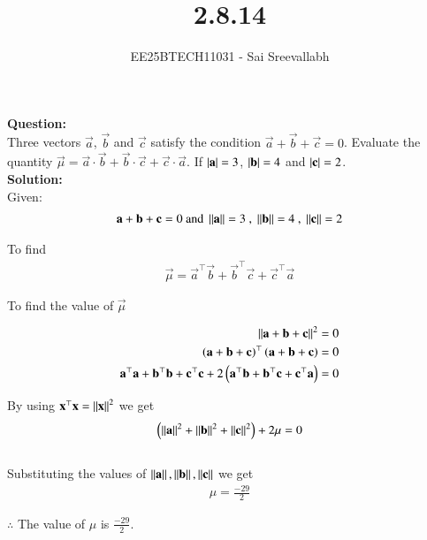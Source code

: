 \documentclass[journal]{IEEEtran}
\begin{document}

\vspace{3cm}

\title{2.8.14}
\author {EE25BTECH11031 - Sai Sreevallabh}
{\let\newpage\relax\maketitle}

\renewcommand{\thefigure}{\theenumi}
\renewcommand{\thetable}{\theenumi}
\setlength{\intextsep}{10pt} %


\renewcommand{\thetable}{\theenumi}

\textbf{Question: }\\

Three vectors $\vec{a}$, $\vec{b}$ and $\vec{c}$ satisfy the condition $\vec{a}+\vec{b}+\vec{c}=0$. Evaluate the quantity $\vec{\mu} = \vec{a}\cdot\vec{b} + \vec{b}\cdot\vec{c} + \vec{c}\cdot\vec{a}$. If $\left\vert\mathbf{a}\right\vert = 3$, $\left\vert\mathbf{b}\right\vert=4$ and $\left\vert\mathbf{c}\right\vert=2$. \\

\textbf{Solution: }\\

Given: 
\begin{align}
    \vec{a}+\vec{b}+\vec{c}=0 \ \text{and}\ \norm{\vec{a}}=3 \ , \ \norm{\vec{b}}=4 \ , \ \norm{\vec{c}}=2
\end{align}

To find
\begin{align}
    \vec{\mu} = \vec{a}^\top\vec{b}+\vec{b}^\top\vec{c}+\vec{c}^\top\vec{a}
\end{align}

To find the value of $\vec{\mu}$

\begin{align}
    \left\lVert\mathbf{a}+\mathbf{b}+\mathbf{c}\right\rVert^2 &= 0\\
    \left(\mathbf{a}+\mathbf{b}+\mathbf{c}\right)^\top\left(\mathbf{a}+\mathbf{b}+\mathbf{c}\right)&=0\\
    \mathbf{a}^\top\mathbf{a} + \mathbf{b}^\top\mathbf{b} +\mathbf{c}^\top\mathbf{c} + 2\left(\mathbf{a}^\top\mathbf{b} + \mathbf{b}^\top\mathbf{c} + \mathbf{c}^\top\mathbf{a}\right) &= 0
\end{align}

By using $\mathbf{x}^\top\mathbf{x} = \left\lVert\mathbf{x}\right\rVert^2$ we get
\begin{align}
    \left(\left\lVert\mathbf{a}\right\rVert^2 + \left\lVert\mathbf{b}\right\rVert^2 + \left\lVert\mathbf{c}\right\rVert^2\right) + 2\mu = 0
\end{align}\\

Substituting the values of $\left\lVert\mathbf{a}\right\rVert, \left\lVert\mathbf{b}\right\rVert, \left\lVert\mathbf{c}\right\rVert$ we get
\begin{align}
  \mu = \frac{-29}{2}
\end{align}

$\therefore$ The value of $\mu$ is $\frac{-29}{2}$.
\end{document}
